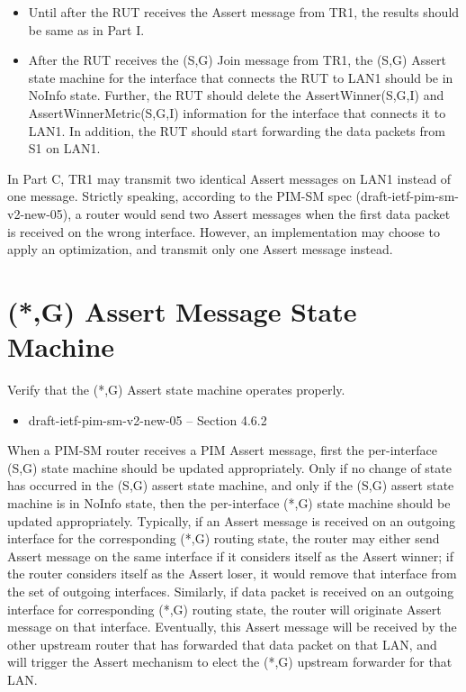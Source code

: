 \documentclass[11pt]{report}
\begin{document}

\begin{itemize}

  \item Until after the RUT receives the Assert message from TR1, the
  results should be same as in Part I.

  \item After the RUT receives the (S,G) Join message from TR1, the (S,G)
  Assert state machine for the interface that connects the RUT to LAN1 should
  be in NoInfo state.
  Further, the RUT should delete the AssertWinner(S,G,I) and
  AssertWinnerMetric(S,G,I) information for the interface that connects it to
  LAN1.
  In addition, the RUT should start forwarding the data packets from S1 on
  LAN1.

\end{itemize}

In Part C, TR1 may transmit two identical Assert messages on LAN1 instead of
one message. Strictly speaking, according to the PIM-SM spec
(draft-ietf-pim-sm-v2-new-05), a router would send two Assert messages
when the first data packet is received on the wrong interface.
However, an implementation may choose to apply an optimization, and
transmit only one Assert message instead.

\newpage
\section{(*,G) Assert Message State Machine}

Verify that the (*,G) Assert state machine operates properly.

\begin{itemize}
  \item draft-ietf-pim-sm-v2-new-05 -- Section 4.6.2
\end{itemize}

When a PIM-SM router receives a PIM Assert message, first the per-interface
(S,G) state machine should be updated appropriately. Only if no change of
state has occurred in the (S,G) assert state machine, and only if the (S,G)
assert state machine is in NoInfo state, then the per-interface
(*,G) state machine should be updated appropriately. Typically, if an
Assert message is received on an outgoing interface for the corresponding
(*,G) routing state, the router may either send Assert message on the
same interface if it considers itself as the Assert winner; if the router
considers itself as the Assert loser, it would remove that interface from the
set of outgoing interfaces. Similarly, if data packet is received on an
outgoing interface for corresponding (*,G) routing state, the router will
originate Assert message on that interface. Eventually, this Assert message
will be received by the other upstream router that has forwarded that data
packet on that LAN, and will trigger the Assert mechanism to elect the (*,G)
upstream forwarder for that LAN.
\end{document}
